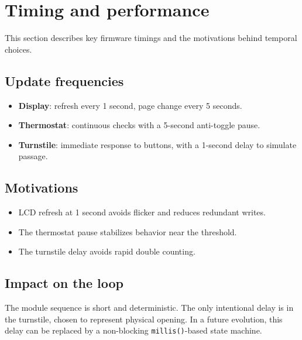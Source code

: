 \chapter{Timing and performance}

This section describes key firmware timings and the motivations behind temporal choices.

\section{Update frequencies}
\begin{itemize}
  \item \textbf{Display}: refresh every 1 second, page change every 5 seconds.
  \item \textbf{Thermostat}: continuous checks with a 5-second anti-toggle pause.
  \item \textbf{Turnstile}: immediate response to buttons, with a 1-second delay to simulate passage.
\end{itemize}

\section{Motivations}
\begin{itemize}
  \item LCD refresh at 1 second avoids flicker and reduces redundant writes.
  \item The thermostat pause stabilizes behavior near the threshold.
  \item The turnstile delay avoids rapid double counting.
\end{itemize}

\section{Impact on the loop}
The module sequence is short and deterministic. The only intentional delay is in the turnstile, chosen to represent physical opening. In a future evolution, this delay can be replaced by a non-blocking \texttt{millis()}-based state machine.
